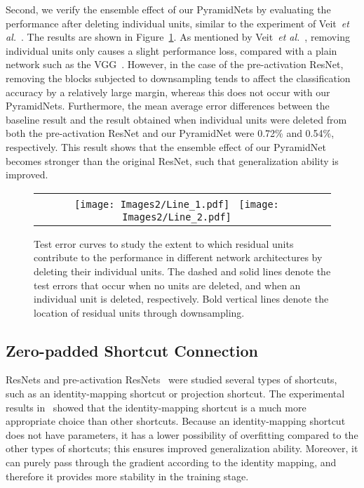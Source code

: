\documentclass[10pt,twocolumn,letterpaper]{article}
\begin{document}
Second, we verify the ensemble effect of our PyramidNets by evaluating the performance after deleting individual units, similar to the experiment of Veit~{\it et al.}~\cite{ensemble}. The results are shown in Figure~\ref{fig:lines}. As mentioned by Veit~{\it et al.}~\cite{ensemble}, removing individual units only causes a slight performance loss, compared with a plain network such as the VGG~\cite{VGG}. However, in the case of the pre-activation ResNet, removing the blocks subjected to downsampling tends to affect the classification accuracy by a relatively large margin, whereas this does not occur with our PyramidNets. Furthermore, the mean average error differences between the baseline result and the result obtained when individual units were deleted from both the pre-activation ResNet and our PyramidNet were 0.72\% and 0.54\%, respectively. This result shows that the ensemble effect of our PyramidNet becomes stronger than the original ResNet, such that generalization ability is improved.

\begin{figure}[t]
\begin{center}
\begin{tabular}{cc}
\texttt{[image: Images2/Line\_1.pdf]} \
\texttt{[image: Images2/Line\_2.pdf]}
\end{tabular}
\end{center}
\caption{Test error curves to study the extent to which residual units contribute to the performance in different network architectures by deleting their individual units. The dashed and solid lines denote the test errors that occur when no units are deleted, and when an individual unit is deleted, respectively. Bold vertical lines denote the location of residual units through downsampling.}
\label{fig:lines}
\end{figure}

\subsection{Zero-padded Shortcut Connection}
ResNets and pre-activation ResNets~\cite{resnet, preresnet} were studied several types of shortcuts, such as an identity-mapping shortcut or projection shortcut. The experimental results in~\cite{preresnet} showed that the identity-mapping shortcut is a much more appropriate choice than other shortcuts. Because an identity-mapping shortcut does not have parameters, it has a lower possibility of overfitting compared to the other types of shortcuts; this ensures improved generalization ability. Moreover, it can purely pass through the gradient according to the identity mapping, and therefore it provides more stability in the training stage.
\end{document}
